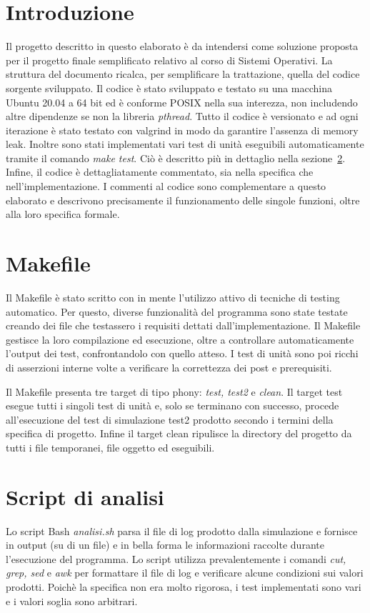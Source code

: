 \documentclass[11pt]{article}
\begin{document}
\section{Introduzione}
Il progetto descritto in questo elaborato è da intendersi come soluzione
proposta per il progetto finale semplificato relativo al corso di Sistemi
Operativi. La struttura del documento ricalca, per semplificare la trattazione,
quella del codice sorgente sviluppato. Il codice è stato sviluppato e testato
su una macchina Ubuntu 20.04 a 64 bit ed è conforme POSIX nella sua interezza,
non includendo altre dipendenze se non la libreria \emph{pthread}. Tutto il
codice è versionato e ad ogni iterazione è stato testato con valgrind in modo
da garantire l'assenza di memory leak. Inoltre sono stati implementati vari
test di unità eseguibili automaticamente tramite il comando \emph{make test}.
Ciò è descritto più in dettaglio nella sezione~\ref{sec:makefile}.
Infine, il codice è dettagliatamente commentato, sia nella specifica che
nell'implementazione. I commenti al codice sono complementare a questo
elaborato e descrivono precisamente il funzionamento delle singole funzioni,
oltre alla loro specifica formale.

\section{Makefile}\label{sec:makefile}
Il Makefile è stato scritto con in mente l'utilizzo attivo di tecniche di
testing automatico. Per questo, diverse funzionalità del programma sono state
testate creando dei file che testassero i requisiti dettati
dall'implementazione. Il Makefile gestisce la loro compilazione ed esecuzione,
oltre a controllare automaticamente l'output dei test, confrontandolo con
quello atteso. I test di unità sono poi ricchi di asserzioni interne volte a
verificare la correttezza dei post e prerequisiti.

Il Makefile presenta tre target di tipo phony: \emph{test, test2} e
\emph{clean}. Il target test esegue tutti i singoli test di unità e, solo se
terminano con successo, procede all'esecuzione del test di simulazione test2
prodotto secondo i termini della specifica di progetto. Infine il target clean
ripulisce la directory del progetto da tutti i file temporanei, file oggetto ed
eseguibili.

\section{Script di analisi}
Lo script Bash \emph{analisi.sh} parsa il file di log prodotto dalla
simulazione e fornisce in output (su di un file) e in bella forma le
informazioni raccolte durante l'esecuzione del programma. Lo script utilizza
prevalentemente i comandi \emph{cut, grep, sed} e \emph{awk} per formattare il
file di log e verificare alcune condizioni sui valori prodotti. Poichè la
specifica non era molto rigorosa, i test implementati sono vari e i valori
soglia sono arbitrari.
\end{document}
